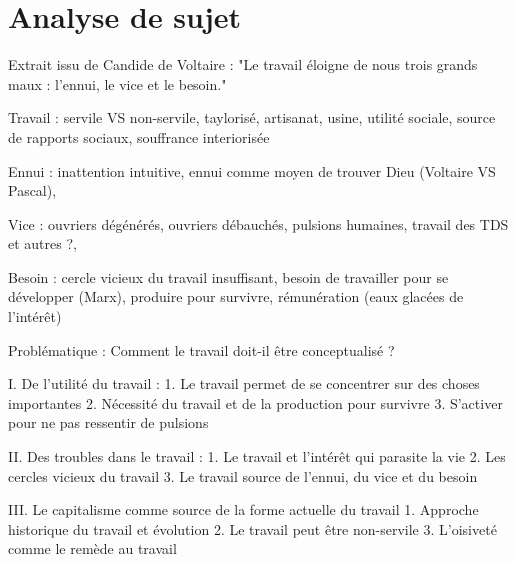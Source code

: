 \documentclass[a4paper,12pt]{book}
\begin{document}
\section{Analyse de sujet}
Extrait issu de Candide de Voltaire : "Le travail éloigne de nous trois grands maux : l'ennui, le vice et le besoin."
\par Travail : servile VS non-servile, taylorisé, artisanat, usine, utilité sociale, source de rapports sociaux, souffrance interiorisée
\par Ennui : inattention intuitive, ennui comme moyen de trouver Dieu (Voltaire VS Pascal), 
\par Vice : ouvriers dégénérés, ouvriers débauchés, pulsions humaines, travail des TDS et autres ?, 
\par Besoin : cercle vicieux du travail insuffisant, besoin de travailler pour se développer (Marx), produire pour survivre, rémunération (eaux glacées de l'intérêt)
\par Problématique : Comment le travail doit-il être conceptualisé ?
\par I. De l'utilité du travail :
1. Le travail permet de se concentrer sur des choses importantes 2. Nécessité du travail et de la production pour survivre 3. S'activer pour ne pas ressentir de pulsions
\par II. Des troubles dans le travail :
1. Le travail et l'intérêt qui parasite la vie 2. Les cercles vicieux du travail 3. Le travail source de l'ennui, du vice et du besoin
\par III. Le capitalisme comme source de la forme actuelle du travail
1. Approche historique du travail et évolution  2. Le travail peut être non-servile 3. L'oisiveté comme le remède au travail
\end{document}
